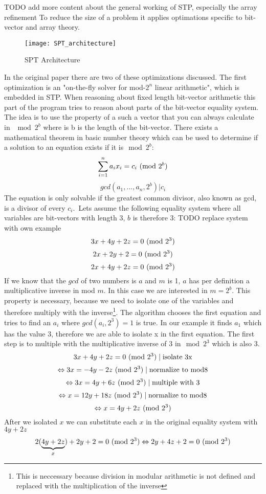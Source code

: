 TODO add more content about the general working of STP, especially the array refinement
To reduce the size of a problem it applies optimations specific to bit-vector and array theory.
\begin{figure}
\texttt{[image: SPT\_architecture]}
\centering
\caption{SPT Architecture}
\label{fig:spt_architecture}
\end{figure}
In the original paper\cite{Ganesh:2007:DPB:1770351.1770421} there are two of these optimizations discussed. The first optimization is an "on-the-fly solver for mod-$2^n$ linear arithmetic", which is embedded in STP. 
When reasoning about fixed length bit-vector arithmetic this part of the program tries to reason about parts of the bit-vector equality system.
The idea is to use the property of a such a vector that you can always calculate in $\mod{2^b}$ where is b is the length of the bit-vector.
There exists a mathematical theorem in basic number theory which can be used to determine if a solution to an equation exists if it is$\mod{2^b}$:
$$\sum_{i=1}^{n} a_ix_i = c_i  \ (\mathrm{mod}\ 2^b)$$
$$gcd(a_1,...,a_n,2^b) | c_i$$
The equation is only solvable if the greatest common divisor, also known as gcd, is a divisor of every $c_i$.\
Lets assume the following equality system where all variables are bit-vectors with length 3, $b$ is therefore 3:
TODO replace system with own example
$$3x+4y+2z=0 \ (\mathrm{mod}\ 2^3)$$
$$2x+2y+2=0  \ (\mathrm{mod}\ 2^3)$$
$$2x+4y+2z=0 \ (\mathrm{mod}\ 2^3)$$
If we know that the $gcd$ of two numbers is $a$ and $m$ is 1, $a$ has per definition a multiplicative inverse in mod $m$. In this case we are interested in $m=2^b$. This property is necessary, because we need to isolate one of the variables and therefore multiply with the inverse\footnote{This is neccessary because division in modular arithmetic is not defined and replaced with the multiplication of the inverse}.
The algorithm chooses the first equation and tries to find an $a_i$ where $gcd(a_i,2^3) = 1$ is true. In our example it finds $a_1$ which has the value $3$, therefore we are able to isolate x in the first equation.
The first step is to multiple with the multiplicative inverse of 3 in$\mod{2^3}$ which is also 3.
$$3x+4y+2z = 0 \ (\mathrm{mod}\ 2^3) \mid \text{isolate 3x}$$
$$\Leftrightarrow 3x=-4y-2z  \ (\mathrm{mod}\ 2^3)  \mid \text{normalize to mod8}$$
$$\Leftrightarrow 3x=4y+6z  \ (\mathrm{mod}\ 2^3)  \mid \text{multiple with 3}$$
$$\Leftrightarrow x=12y+18z \ (\mathrm{mod}\ 2^3)  \mid \text{normalize to mod8}$$
$$\Leftrightarrow x=4y+2z \ (\mathrm{mod}\ 2^3) $$
After we isolated $x$ we can substitute each $x$ in the original equality system with $4y+2z$
$$2(\underbrace{4y+2z}_{x})+2y+2=0 \ (\mathrm{mod}\ 2^3) \Leftrightarrow 2y + 4z + 2 = 0\ (\mathrm{mod}\ 2^3) $$
